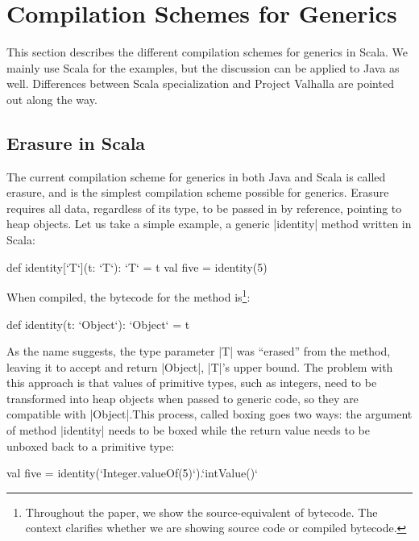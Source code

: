 \section{Compilation Schemes for Generics}
\label{mbox2:sec:minibox}

This section describes the different compilation schemes for generics in Scala. We mainly use Scala for the examples, but the discussion can be applied to Java as well. Differences between Scala specialization and Project Valhalla are pointed out along the way. %

\subsection{Erasure in Scala}

The current compilation scheme for generics in both Java and Scala is called erasure, and is the simplest compilation scheme possible for generics. Erasure requires all data, regardless of its type, to be passed in by reference, pointing to heap objects. Let us take a simple example, a generic |identity| method written in Scala:

\begin{lstlisting-nobreak}
 def identity[`T`](t: `T`): `T` = t
 val five = identity(5)
\end{lstlisting-nobreak}

When compiled, the bytecode for the method is\footnote{Throughout the paper, we show the source-equivalent of bytecode. The context clarifies whether we are showing source code or compiled bytecode.}:

\begin{lstlisting-nobreak}
 def identity(t: `Object`): `Object` = t
\end{lstlisting-nobreak}

As the name suggests, the type parameter |T| was ``erased'' from the method, leaving it to accept and return |Object|, |T|'s upper bound. The problem with this approach is that values of primitive types, such as integers, need to be transformed into heap objects when passed to generic code, so they are compatible with |Object|.This process, called boxing goes two ways: the argument of method |identity| needs to be boxed while the return value needs to be unboxed back to a primitive type:

\begin{lstlisting-nobreak}
 val five = identity(`Integer.valueOf(5)`).`intValue()`
\end{lstlisting-nobreak}

